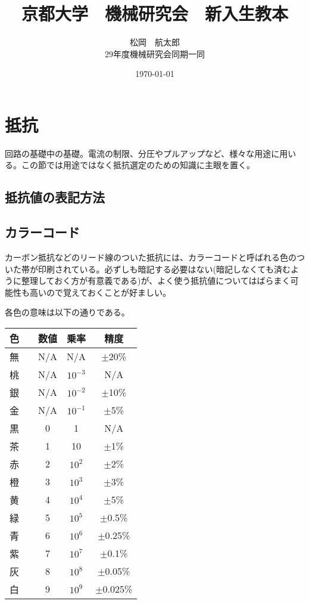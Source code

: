 \documentclass[a4paper,titlepage,here]{ujarticle}
\title{京都大学　機械研究会　新入生教本}
\date{\today}
\author{松岡　航太郎\\29年度機械研究会同期一同}
\begin{document}
\maketitle
\tableofcontents
\newpage
\section{抵抗}
回路の基礎中の基礎。電流の制限、分圧やプルアップなど、様々な用途に用いる。この節では用途ではなく抵抗選定のための知識に主眼を置く。
\subsection{抵抗値の表記方法}
\subsection{カラーコード}
カーボン抵抗などのリード線のついた抵抗には、カラーコードと呼ばれる色のついた帯が印刷されている。必ずしも暗記する必要はない(暗記しなくても済むように整理しておく方が有意義である)が、よく使う抵抗値についてはばらまく可能性も高いので覚えておくことが好ましい。

各色の意味は以下の通りである。

\begin{table}[H]
	\begin{tabular}{|cc|c|c|c|}\hline
		色&&数値&乗率&精度\\ \hline
		無&&N/A&N/A&$\pm$20\%\\ \hline
		桃&\cellcolor[rgb]{1,0.412,0.706}{　}&N/A&$10^{-3}$&N/A\\ \hline
		銀&\cellcolor[rgb]{0.753,0.753,0.753}{　}&N/A&$10^{-2}$&$\pm$10\%\\ \hline
		金&\cellcolor[rgb]{0.812,0.71,0.231}{　}&N/A&$10^{-1}$&$\pm$5\%\\ \hline
		黒&\cellcolor{black}{　}&0&1&N/A\\ \hline
		茶&\cellcolor[rgb]{0.647059,0.164706,0.164706}{　}&1&10&$\pm$1\%\\ \hline
		赤&\cellcolor{red}{　}&2&$10^2$&$\pm$2\%\\ \hline
		橙&\cellcolor[rgb]{0.894118,0.368627,0}{　}&3&$10^3$&$\pm$3\% \\ \hline
		黄&\cellcolor{yellow}{　}&4&$10^4$&$\pm$5\%\\ \hline
		緑&\cellcolor{green}{　}&5&$10^5$&$\pm$0.5\%\\ \hline
		青&\cellcolor{blue}{　}&6&$10^6$&$\pm$0.25\%\\ \hline
		紫&\cellcolor[rgb]{0.58,0,0.827}{　}&7&$10^7$&$\pm$0.1\%\\ \hline
		灰&\cellcolor[rgb]{0.627,0.627,0.627}{　}&8&$10^8$&$\pm$0.05\%\\ \hline
		白&\cellcolor[rgb]{1,1,1}{　}&9&$10^9$&$\pm$0.025\%\\ \hline
	\end{tabular}
\end{table}
\end{document}
